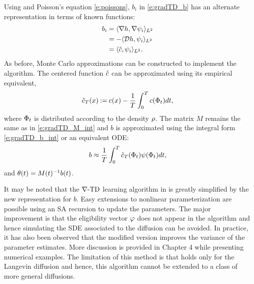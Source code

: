 Using  and Poisson's equation \eqref{e:poissons}, $b_i$ in \eqref{e:gradTD_b} has an alternate representation in terms of known functions:
\begin{equation}
\begin{aligned}
b_i & = \langle \nabla h, \nabla \basis_i \rangle_{L^2} \\ 
& = - \langle \generate h, \basis_i \rangle_{L^2} \\ 
& =\langle \tilc, \basis_i \rangle_{L^2}.
\label{e:b_alt}
\end{aligned}
\end{equation}
As before, Monte Carlo approximations can be constructed to implement the algorithm. The centered function $\tilde c$ can be approximated using its empirical equivalent,
\begin{equation}
\tilde c_T(x) \mathbin{:=} c(x) - \frac{1}{T} \int_0^T c(\Phi_t) dt,
\end{equation}
where $\Phi_t$ is distributed according to the density $\rho$. The matrix $M$ remains the same as in \eqref{e:gradTD_M_int} and $b$ is approximated using the integral form \eqref{e:gradTD_b_int} or an equivalent ODE:
\begin{equation}
b \approx \frac{1}{T} \int_0^T \tilc_T(\markovstate_t) \basis(\markovstate_t) dt,
\label{e:gradTD_b_int}
\end{equation}
and $\theta(t) = M(t)^{-1} b(t)$. 

It may be noted that the $\nabla\text{-TD}$ learning algorithm in  is greatly simplified by the new representation for $b$. Easy extensions to nonlinear parameterization are possible using an SA recursion to update the parameters. The major improvement is that the eligibility vector $\varphi$ does not appear in the algorithm and hence simulating the SDE associated to the diffusion can be avoided. In practice, it has also been observed that the modified version improves the variance of the parameter estimates. More discussion is provided in Chapter 4 while presenting numerical examples. The limitation of this method is that  holds only for the Langevin diffusion and hence, this algorithm cannot be extended to a class of more general diffusions. 
 
